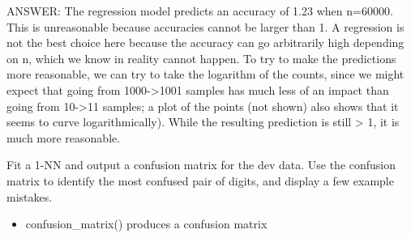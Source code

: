 \documentclass[11pt]{article}
\providecommand{\tightlist}{%
      \setlength{\itemsep}{0pt}\setlength{\parskip}{0pt}}
\begin{document}
    ANSWER: The regression model predicts an accuracy of 1.23 when n=60000.
This is unreasonable because accuracies cannot be larger than 1. A
regression is not the best choice here because the accuracy can go
arbitrarily high depending on n, which we know in reality cannot happen.
To try to make the predictions more reasonable, we can try to take the
logarithm of the counts, since we might expect that going from
1000-\textgreater{}1001 samples has much less of an impact than going
from 10-\textgreater{}11 samples; a plot of the points (not shown) also
shows that it seems to curve logarithmically). While the resulting
prediction is still \textgreater{} 1, it is much more reasonable.

    Fit a 1-NN and output a confusion matrix for the dev data. Use the
confusion matrix to identify the most confused pair of digits, and
display a few example mistakes.

\begin{itemize}
\tightlist
\item
  confusion\_matrix() produces a confusion matrix
\end{itemize}
\end{document}
